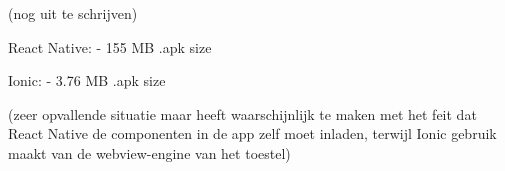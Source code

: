 (nog uit te schrijven)

React Native:
  - 155 MB .apk size

Ionic: 
  - 3.76 MB .apk size

(zeer opvallende situatie maar heeft waarschijnlijk te maken met het feit dat React Native de componenten in de app zelf moet inladen, terwijl Ionic gebruik maakt van de webview-engine van het toestel)